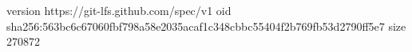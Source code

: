 version https://git-lfs.github.com/spec/v1
oid sha256:563bc6c67060fbf798a58e2035acaf1c348cbbc55404f2b769fb53d2790ff5e7
size 270872
